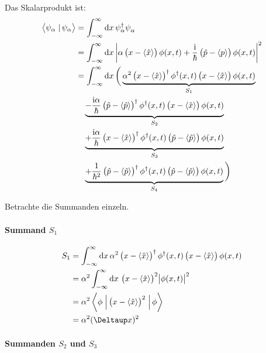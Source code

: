 Das Skalarprodukt ist:
\begin{align*}
	\braket{\psi_\alpha}{\psi_\alpha}
	&= \int_{-\infty}^\infty \dif x \, \psi_\alpha^\dagger \psi_\alpha^{} \\
	&= \int_{-\infty}^\infty \dif x \, \abs{\alpha \del{x - \bracket{\hat x}} \phi(x, t) + \frac\ii\hbar \del{\hat p - \bracket p} \phi(x, t)}^2 \\
	&= \int_{-\infty}^\infty \dif x \, \bigg(
	\underbrace{
		\alpha^2
		\del{x - \bracket{\hat x}}^\dagger \phi^\dagger(x, t)
		\del{x - \bracket{\hat x}} \phi(x, t)
	}_{S_1} \\
	&\quad
	\underbrace{
	- \frac{\ii \alpha}\hbar
	\del{\hat p - \bracket{\hat p}}^\dagger \phi^\dagger(x, t)
	\del{x - \bracket{\hat x}} \phi(x, t)
	}_{S_2} \\
	&\quad
	\underbrace{
	+ \frac{\ii \alpha}\hbar
	\del{x - \bracket{\hat x}}^\dagger \phi^\dagger(x, t)
	\del{\hat p - \bracket{\hat p}} \phi(x, t)
	}_{S_3} \\
	&\quad
	\underbrace{
	+ \frac{1}{\hbar^2}
	\del{\hat p - \bracket{\hat p}}^\dagger \phi^\dagger(x, t)
	\del{\hat p - \bracket{\hat p}} \phi(x, t)
	}_{S_4}
	\bigg)
\end{align*}

Betrachte die Summanden einzeln.

\paragraph{Summand $S_1$}

\begin{align*}
	S_1
	&= \int_{-\infty}^\infty \dif x \, \alpha^2 \del{x - \bracket{\hat x}}^\dagger \phi^\dagger(x, t) \del{x - \bracket{\hat x}} \phi(x, t) \\
	&= \alpha^2 \int_{-\infty}^\infty \dif x \, \del{x - \bracket{\hat x}}^2  \abs{\phi(x, t)}^2 \\
	&= \alpha^2 \braproket\phi{\del{x - \bracket{\hat x}}^2}\phi \\
	&= \alpha^2 (\Deltaup x)^2
\end{align*}

\paragraph{Summanden $S_2$ und $S_3$}

